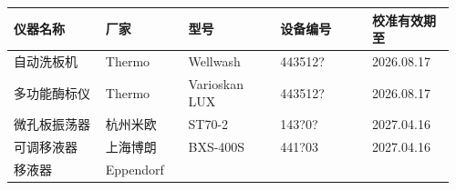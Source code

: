 \documentclass[UTF8,10pt,a4paper,fontset=fandol]{ctexart}
\newcommand{\fieldvalue}[1]{#1}
\newcommand{\handwritten}[1]{#1}
\begin{document}
\begin{tabular}{|p{0.20\linewidth}|p{0.18\linewidth}|p{0.20\linewidth}|p{0.20\linewidth}|p{0.18\linewidth}|}
\hline
仪器名称 & 厂家 & 型号 & 设备编号 & 校准有效期至
\\ \hline
\fieldvalue{自动洗板机} &
\fieldvalue{Thermo} &
\fieldvalue{Wellwash} &
\fieldvalue{\handwritten{443512?}} &
\fieldvalue{\handwritten{2026.08.17}}
\\ \hline
\fieldvalue{多功能酶标仪} &
\fieldvalue{Thermo} &
\fieldvalue{Varioskan LUX} &
\fieldvalue{\handwritten{443512?}} &
\fieldvalue{\handwritten{2026.08.17}}
\\ \hline
\fieldvalue{微孔板振荡器} &
\fieldvalue{杭州米欧} &
\fieldvalue{ST70-2} &
\fieldvalue{\handwritten{143?0?}} &
\fieldvalue{\handwritten{2027.04.16}}
\\ \hline
\fieldvalue{可调移液器} &
\fieldvalue{上海博朗} &
\fieldvalue{BXS-400S} &
\fieldvalue{\handwritten{441?03}} &
\fieldvalue{\handwritten{2027.04.16}}
\\ \hline
\fieldvalue{移液器} &
\fieldvalue{Eppendorf} &

\end{tabular}
\end{document}
